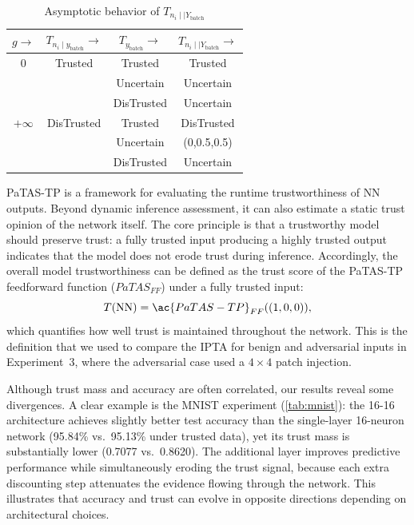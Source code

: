 \begin{table}[h!]
\centering
\begin{tabular}{cccc}
\hline
\(g \to\) & \(T_{n_i\mid y_\text{batch}} \to\) & \(T_{y_\text{batch}} \to\) & \(T_{n_i\mid \mid {Y_\text{batch}}} \to\) \\
\hline
\(0\)& Trusted& Trusted& Trusted\\

& & Uncertain &  Uncertain \\

& & DisTrusted &  Uncertain \\

\(+\infty\) & DisTrusted& Trusted & DisTrusted \\

 &  & Uncertain &  (0,0.5,0.5) \\

 &  & DisTrusted &  Uncertain \\
\hline
\end{tabular}
\caption{Asymptotic behavior of \(T_{n_i\mid \mid {Y_\text{batch}}} \)}
\label{tab:asympt}
\end{table}

\ac{PaTAS-TP} is a framework for evaluating the runtime trustworthiness of \ac{NN} outputs. Beyond dynamic inference assessment, it can also estimate a static trust opinion of the network itself. The core principle is that a trustworthy model should preserve trust: a fully trusted input producing a highly trusted output indicates that the model does not erode trust during inference. Accordingly, the overall model trustworthiness can be defined as the trust score of the \ac{PaTAS-TP} feedforward function (\(PaTAS_{FF}\)) under a fully trusted input:
\[
T(\text{NN}) = \ac{PaTAS-TP}_{FF}((1, 0, 0)),
\]
which quantifies how well trust is maintained throughout the network. This is the definition that we used to compare the \ac{IPTA} for benign and adversarial inputs in Experiment~3, where the adversarial case used a \(4\times4\) patch injection. 

Although trust mass and accuracy are often correlated, our results reveal some divergences. A clear example is the MNIST experiment (\cref{tab:mnist}): the 16-16 architecture achieves slightly better test accuracy than the single-layer 16-neuron network (95.84\% vs.\ 95.13\% under trusted data), yet its trust mass is substantially lower (0.7077 vs.\ 0.8620). The additional layer improves predictive performance while simultaneously eroding the trust signal, because each extra discounting step attenuates the evidence flowing through the network. This illustrates that accuracy and trust can evolve in opposite directions depending on architectural choices.

